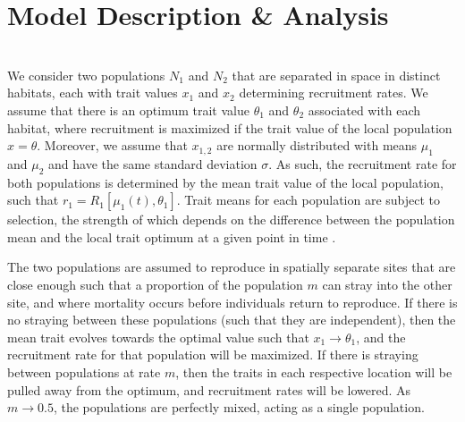 \documentclass[twocolumn,preprintnumbers,amsmath,amssymb,superscriptaddress]{revtex4}
\begin{document}




\section{Model Description \& Analysis}

\\
\noindent We consider two populations $N_1$ and $N_2$ that are separated in space in distinct habitats, each with trait values $x_1$ and $x_2$ determining recruitment rates.
We assume that there is an optimum trait value $\theta_1$ and $\theta_2$ associated with each habitat, where recruitment is maximized if the trait value of the local population $x = \theta$.
Moreover, we assume that $x_{1,2}$ are normally distributed with means $\mu_1$ and $\mu_2$ and have the same standard deviation $\sigma$.
As such, the recruitment rate for both populations is determined by the mean trait value of the local population, such that $r_1 = R_1[\mu_1(t),\theta_1]$.
Trait means for each population are subject to selection, the strength of which depends on the difference between the population mean and the local trait optimum at a given point in time \cite{simpson1953major,Lande:1976ga}.

The two populations are assumed to reproduce in spatially separate sites that are close enough such that a proportion of the population $m$ can stray into the other site, and where mortality occurs before individuals return to reproduce.
If there is no straying between these populations (such that they are independent), then the mean trait evolves towards the optimal value such that $x_1 \rightarrow \theta_1$, and the recruitment rate for that population will be maximized.
If there is straying between populations at rate $m$, then the traits in each respective location will be pulled away from the optimum, and recruitment rates will be lowered.
As $m \rightarrow 0.5$, the populations are perfectly mixed, acting as a single population.
\end{document}
